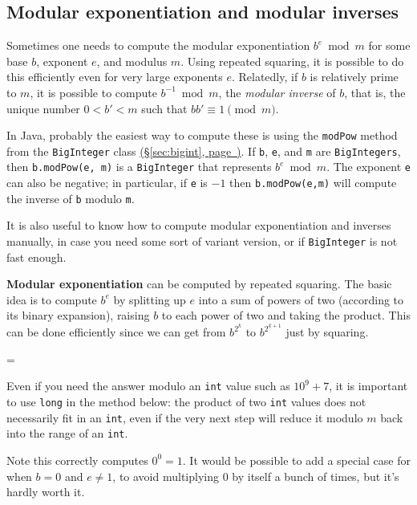 \documentclass[10pt]{book}
\newcommand*{\link}[1]{\hyperref[{#1}]{(\S\ref*{#1}, page~\pageref*{#1})}}
\newenvironment{warning}
{\par\begin{mdframed}[linewidth=2pt,linecolor=red]%
    \begin{list}{}{\leftmargin=1cm
        \labelwidth=\leftmargin}\item[\Large\ding{43}]}
    {\end{list}\end{mdframed}\par}
\begin{document}
\subsection*{Modular exponentiation and modular inverses}

Sometimes one needs to compute the modular exponentiation
$b^e \bmod m$ for some base $b$, exponent $e$, and modulus $m$.  Using
repeated squaring, it is possible to do this efficiently even for very
large exponents $e$.  Relatedly, if $b$ is relatively prime to $m$, it
is possible to compute $b^{-1} \bmod m$, the \emph{modular inverse} of
$b$, that is, the unique number $0 < b' < m$ such that
$bb' \equiv 1 \pmod m$.

In Java, probably the easiest way to compute these is using the
\texttt{modPow} method from the \texttt{BigInteger} class
\link{sec:bigint}.  If \texttt{b}, \texttt{e}, and \texttt{m} are
\texttt{BigIntegers}, then \texttt{b.modPow(e, m)} is a
\texttt{BigInteger} that represents $b^e \bmod m$.  The exponent
\texttt{e} can also be negative; in particular, if \texttt{e} is $-1$
then \texttt{b.modPow(e,m)} will compute the inverse of
\texttt{b} modulo \texttt{m}.

It is also useful to know how to compute modular exponentiation and
inverses manually, in case you need some sort of variant version, or
if \texttt{BigInteger} is not fast enough.

\textbf{Modular exponentiation} can be computed by repeated squaring.
The basic idea is to compute $b^e$ by splitting up $e$ into a sum of
powers of two (according to its binary expansion), raising $b$ to each
power of two and taking the product.  This can be done efficiently
since we can get from $b^{2^k}$ to $b^{2^{k+1}}$ just by squaring.

  \begin{warning}
    Even if you need the answer modulo an \texttt{int} value such
    as $10^9 + 7$, it is important to use \texttt{long} in the method
    below: the product of two \texttt{int} values does not necessarily
    fit in an \texttt{int}, even if the very next step will reduce it
    modulo $m$ back into the range of an \texttt{int}.
  \end{warning}


Note this correctly computes $0^0 = 1$.  It would be possible to add a
special case for when $b = 0$ and $e \neq 1$, to avoid multiplying $0$
by itself a bunch of times, but it's hardly worth it.
\end{document}
